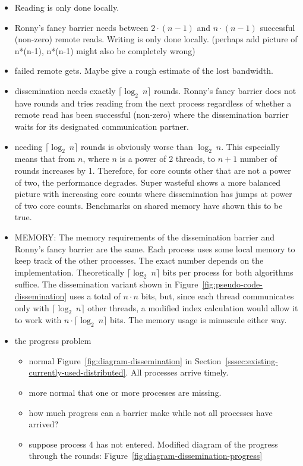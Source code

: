 \documentclass[a4paper, 10pt]{article}
\begin{document}
\begin{itemize}
	\item Reading is only done locally.
	\item Ronny's fancy barrier needs between $2 \cdot (n-1)$ and $n \cdot (n-1)$ successful (non-zero) remote reads. Writing is only done locally. (perhaps add picture of n*(n-1), n*(n-1) might also be completely wrong)
	\item failed remote gets. Maybe give a rough estimate of the lost bandwidth.
	\item dissemination needs exactly $\lceil \log _2~n \rceil$ rounds. Ronny's fancy barrier does not have rounds and tries reading from the next process regardless of whether a remote read has been successful (non-zero) where the dissemination barrier waits for its designated communication partner.
	\item needing $\lceil \log _2~n \rceil$ rounds is obviously worse than $\log _2~n$. This especially means that from $n$, where $n$ is a power of 2 threads, to $n+1$ number of rounds increases by 1. Therefore, for core counts other that are not a power of two, the performance degrades. Super wasteful shows a more balanced picture with increasing core counts where dissemination has jumps at power of two core counts. Benchmarks on shared memory have shown this to be true.
	\item MEMORY: The memory requirements of the dissemination barrier and Ronny's fancy barrier are the same. Each process uses some local memory to keep track of the other processes. The exact number depends on the implementation. Theoretically $\lceil \log _2~n \rceil$ bits per process for both algorithms suffice. The dissemination variant shown in Figure~\ref{fig:pseudo-code-dissemination} uses a total of $n \cdot n$ bits, but, since each thread communicates only with $\lceil \log _2~n \rceil$ other threads, a modified index calculation would allow it to work with $n \cdot \lceil \log _2 ~n \rceil$ bits. The memory usage is minuscule either way.
	\item the progress problem
		\begin{itemize}
			\item normal Figure~\ref{fig:diagram-dissemination} in Section~\ref{sssec:existing-currently-used-distributed}. All processes arrive timely.
			\item more normal that one or more processes are missing.
			\item how much progress can a barrier make while not all processes have arrived?
			\item suppose process 4 has not entered. Modified diagram of the progress through the rounds: Figure~\ref{fig:diagram-dissemination-progress}

\end{itemize}
\end{itemize}
\end{document}
